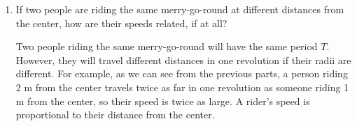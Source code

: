\documentclass[main]{subfiles}
\begin{document}
\begin{enumerate}
\begin{enumerate}[start=2]
\begin{tasks}[before-skip=0pt,label=\roman*.]
    \begin{solution}
        $2\pi$ m divided by 10 s gives 
    \end{solution}
    
    \task
    \begin{problem}
        2\,m from the center
    \end{problem}

    \begin{solution}
        $4\pi$ m divided by 10 s gives 
    \end{solution}
    \end{tasks}

\item
\begin{problem}
If two people are riding the same merry-go-round at different distances from the center, how are their speeds related, if at all?
\end{problem}

\begin{solution}
    Two people riding the same merry-go-round will have the same period $T$. However, they will travel different distances in one revolution if their radii are different. For example, as we can see from the previous parts, a person riding 2 m from the center travels twice as far in one revolution as someone riding 1 m from the center, so their speed is twice as large. A rider's speed is proportional to their distance from the center.
\end{solution}

\end{enumerate}
\end{enumerate}

\end{document}
